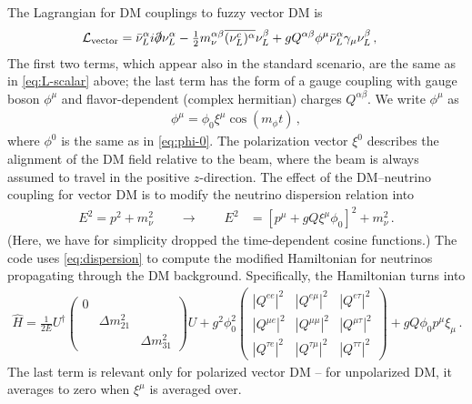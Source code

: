 \documentclass{scrartcl}
\begin{document}
The Lagrangian for DM couplings to fuzzy vector DM is \cite{Brdar:2017kbt}
\begin{align}
  \mathcal{L}_\text{vector}
    &= \bar\nu_L^\alpha i \slashed\partial \nu_L^\alpha
     - \tfrac{1}{2} m_\nu^{\alpha\beta} \overline{(\nu_L^c)^\alpha} \nu_L^\beta
     + g Q^{\alpha\beta} \phi^\mu \bar{\nu}_L^\alpha \gamma_\mu \nu_L^\beta \,,
  \label{eq:L-vector}
\end{align}
The first two terms, which appear also in the standard scenario,  are the
same as in \cref{eq:L-scalar} above; the last term has the form of a gauge
coupling with gauge boson $\phi^\mu$ and flavor-dependent (complex hermitian)
charges $Q^{\alpha\beta}$.  We write $\phi^\mu$ as
\begin{align}
  \phi^\mu = \phi_0 \xi^\mu \cos(m_\phi t) \,,
  \label{eq:phi-osc-vector}
\end{align}
where $\phi^0$ is the same as in \cref{eq:phi-0}.  The polarization vector $\xi^0$
describes the alignment of the DM field relative to the beam, where the
beam is always assumed to travel in the positive $z$-direction.
The effect of the DM--neutrino coupling for vector DM is to modify the neutrino
dispersion relation into
\begin{align}
  E^2 = p^2 + m_\nu^2  \qquad\to\qquad
  E^2 &= [p^\mu + g Q \xi^\mu \phi_0]^2 + m_\nu^2 \,.
  \label{eq:dispersion}
\end{align}
(Here, we have for simplicity dropped the time-dependent cosine functions.)
The code uses \cref{eq:dispersion} to compute the modified Hamiltonian for
neutrinos propagating through the DM background.  Specifically, the Hamiltonian
turns into
\begin{align}
  \hat{H} = \frac{1}{2E} U^\dag \begin{pmatrix}
                                  0 &                 &                  \\
                                    & \Delta m_{21}^2 &                  \\
                                    &                 & \Delta m_{31}^2
                                \end{pmatrix}  U
          + g^2 \phi_0^2
            \begin{pmatrix}
              |Q^{ee}|^2     &  |Q^{e\mu}|^2    &  |Q^{e\tau}|^2    \\
              |Q^{\mu e}|^2  &  |Q^{\mu\mu}|^2  &  |Q^{\mu\tau}|^2  \\
              |Q^{\tau e}|^2 &  |Q^{\tau\mu}|^2 &  |Q^{\tau\tau}|^2
            \end{pmatrix}
          + g Q \phi_0 p^\mu \xi_\mu \,.
\end{align}
The last term is relevant only for polarized vector DM -- for unpolarized DM,
it averages to zero when $\xi^\mu$ is averaged over.
\end{document}
